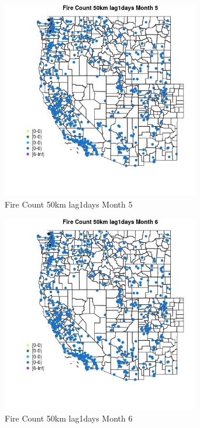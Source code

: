 \begin{figure} 
\centering  
\includegraphics[width=0.77\textwidth]{Code_Outputs/Report_ML_input_PM25_Step4_part_e_de_duplicated_aves_compiled_2019-05-21wNAs_MapObsMo5Fire_Count_50km_lag1days.jpg} 
\caption{\label{fig:Report_ML_input_PM25_Step4_part_e_de_duplicated_aves_compiled_2019-05-21wNAsMapObsMo5Fire_Count_50km_lag1days}Fire Count 50km lag1days Month 5} 
\end{figure} 
 

\begin{figure} 
\centering  
\includegraphics[width=0.77\textwidth]{Code_Outputs/Report_ML_input_PM25_Step4_part_e_de_duplicated_aves_compiled_2019-05-21wNAs_MapObsMo6Fire_Count_50km_lag1days.jpg} 
\caption{\label{fig:Report_ML_input_PM25_Step4_part_e_de_duplicated_aves_compiled_2019-05-21wNAsMapObsMo6Fire_Count_50km_lag1days}Fire Count 50km lag1days Month 6} 
\end{figure} 
 

